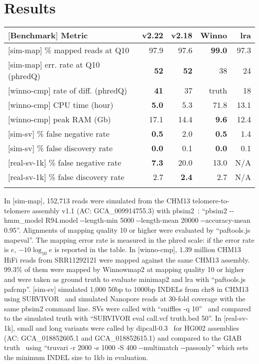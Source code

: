 \documentclass{bioinfo}
\begin{document}
\section{Results}

\begin{table}
{\footnotesize\label{tab:1}\begin{tabular}{p{4.2cm}rrrr}
\toprule
$[$Benchmark$]$ Metric & v2.22 & v2.18 & Winno & lra \\
\midrule
$[$sim-map$]$ \% mapped reads at Q10      & 97.9       & 97.6      & {\bf 99.0}& 97.3 \\
$[$sim-map$]$ err. rate at Q10 (phredQ)   & {\bf 52}   & {\bf 52}  & 38        & 24 \\
$[$winno-cmp$]$ rate of diff. (phredQ)    & {\bf 41}   & 37        & truth     & 18 \\
$[$winno-cmp$]$ CPU time (hour)           & {\bf 5.0}  & 5.3       & 71.8      & 13.1 \\
$[$winno-cmp$]$ peak RAM (Gb)             & 17.1       & 14.4      & {\bf 9.6} & 12.4 \\
$[$sim-sv$]$  \% false negative rate      & {\bf 0.5}  & 2.0       & {\bf 0.5} & 1.4  \\
$[$sim-sv$]$  \% false discovery rate     & {\bf 0.0}  & 0.1       & {\bf 0.0} & 0.1  \\
$[$real-sv-1k$]$ \% false negative rate   & {\bf 7.3}  & 20.0      & 13.0      & N/A \\
$[$real-sv-1k$]$ \% false discovery rate  & 2.7        & {\bf 2.4} & 2.7       & N/A \\
\botrule
\end{tabular}}
{In $[$sim-map$]$, 152,713 reads were simulated from the CHM13 telomere-to-telomere assembly v1.1
(AC: GCA\_009914755.3) with pbsim2~\citep{Ono:2021aa}: ``pbsim2 -{}-hmm\_model R94.model -{}-length-min
5000 -{}-length-mean 20000 -{}-accuracy-mean 0.95''. Alignments of mapping quality
10 or higher were evaluated by ``paftools.js mapeval''. The mapping error rate
is measured in the phred scale: if the error rate is $e$, $-10\log_{10}e$ is
reported in the table. In $[$winno-cmp$]$, 1.39 million CHM13 HiFi reads from
SRR11292121 were mapped against the same CHM13 assembly. 99.3\% of them were mapped by Winnowmap2
at mapping quality 10 or higher and were taken as ground truth to evaluate
minimap2 and lra with ``paftools.js pafcmp''. $[$sim-sv$]$ simulated 1,000
50bp to 1000bp INDELs from chr8 in CHM13 using SURVIVOR~\citep{Jeffares:2017aa} and simulated Nanopore
reads at 30-fold coverage with the same pbsim2 command line. SVs were called with
``sniffles -q 10''~\citep{Sedlazeck:2018ab} and compared to the simulated truth with ``SURVIVOR eval
call.vcf truth.bed 50''. In $[$real-sv-1k$]$, small and long variants were
called by dipcall-0.3~\citep{Li:2018aa} for HG002 assemblies (AC: GCA\_018852605.1 and
GCA\_018852615.1) and compared to the GIAB truth~\citep{Zook:2020aa} using ``truvari -r 2000 -s
1000 -S 400 -{}-multimatch -{}-passonly'' which sets the minimum INDEL size to 1kb in evaluation. }
\end{table}
\end{document}
